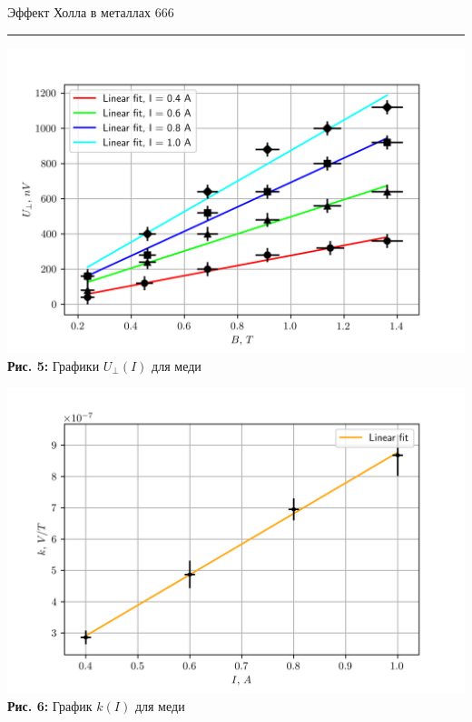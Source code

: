 \documentclass[12pt,a4paper]{scrartcl}
\begin{document}
	\newpage
	
	
	\begin{flushleft}
		\footnotesize{Эффект Холла в металлах} \hspace{\fill} \footnotesize{666}
		\\[-0.3cm]\noindent\rule{\textwidth}{0.3pt}
	\end{flushleft}	
	
	\begin{center}
		\includegraphics[scale=0.7]{PIC_5.png}
		\\\textbf{Рис. 5:} Графики $U_\perp(I)$ для меди
	\end{center}
	
	\begin{center}
		\includegraphics[scale=0.7]{PIC_6.png}
		\\\textbf{Рис. 6:} График $k(I)$ для меди
	\end{center}
	
\end{document}
